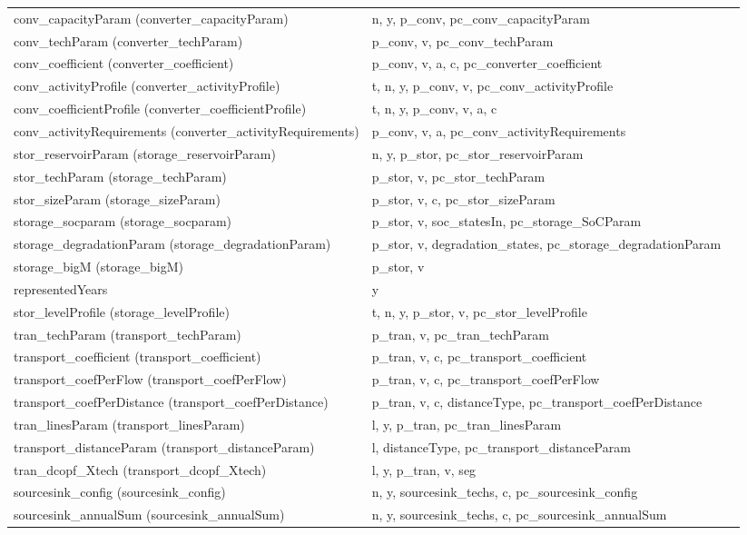 \documentclass[11pt]{article}
\begin{document}
\begin{tabularx}{\textwidth}{| l | l | X |}
conv\_capacityParam (converter\_capacityParam)  & n, y, p\_conv, pc_conv_capacityParam &  \\ 
conv\_techParam (converter\_techParam)  & p\_conv, v, pc_conv_techParam &  \\ 
conv\_coefficient (converter\_coefficient)  & p\_conv, v, a, c, pc\_converter\_coefficient &  \\ 
conv\_activityProfile (converter\_activityProfile)  & t, n, y, p\_conv, v, pc_conv_activityProfile &  \\ 
conv\_coefficientProfile (converter\_coefficientProfile)  & t, n, y, p\_conv, v, a, c &  \\ 
conv\_activityRequirements (converter\_activityRequirements)  & p\_conv, v, a, pc_conv_activityRequirements &  \\ 
stor\_reservoirParam (storage\_reservoirParam)  & n, y, p\_stor, pc_stor_reservoirParam &  \\ 
stor\_techParam (storage\_techParam)  & p\_stor, v, pc_stor_techParam &  \\ 
stor\_sizeParam (storage\_sizeParam)  & p\_stor, v, c, pc_stor_sizeParam &  \\ 
storage\_socparam (storage\_socparam)  & p\_stor, v, soc\_statesIn, pc\_storage\_SoCParam &  \\ 
storage\_degradationParam (storage\_degradationParam)  & p\_stor, v, degradation\_states, pc\_storage\_degradationParam &  \\ 
storage\_bigM (storage\_bigM)  & p\_stor, v &  \\ 
representedYears & y &  \\ 
stor\_levelProfile (storage\_levelProfile)  & t, n, y, p\_stor, v, pc_stor_levelProfile &  \\ 
tran\_techParam (transport\_techParam)  & p\_tran, v, pc_tran_techParam &  \\ 
transport\_coefficient (transport\_coefficient)  & p\_tran, v, c, pc\_transport\_coefficient &  \\ 
transport\_coefPerFlow (transport\_coefPerFlow)  & p\_tran, v, c, pc\_transport\_coefPerFlow &  \\ 
transport\_coefPerDistance (transport\_coefPerDistance)  & p\_tran, v, c, distanceType, pc\_transport\_coefPerDistance &  \\ 
tran\_linesParam (transport\_linesParam)  & l, y, p\_tran, pc_tran_linesParam &  \\ 
transport\_distanceParam (transport\_distanceParam)  & l, distanceType, pc\_transport\_distanceParam &  \\ 
tran\_dcopf\_Xtech (transport\_dcopf\_Xtech)  & l, y, p\_tran, v, seg &  \\ 
sourcesink\_config (sourcesink\_config)  & n, y, sourcesink\_techs, c, pc\_sourcesink\_config &  \\ 
sourcesink\_annualSum (sourcesink\_annualSum)  & n, y, sourcesink\_techs, c, pc\_sourcesink\_annualSum &  \\ 
\hline 
\end{tabularx}
\end{document}
